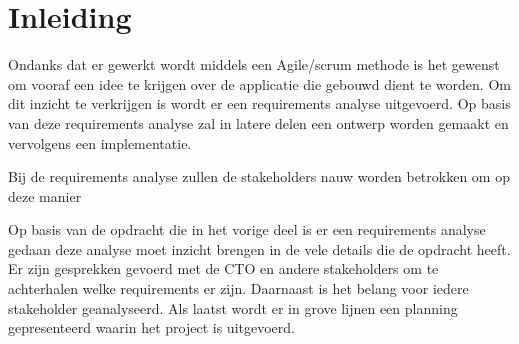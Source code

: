 
\chapter{Inleiding}\label{ch:02_inleiding}\label{inReqPlan}
Ondanks dat er gewerkt wordt middels een Agile/scrum methode is het gewenst om vooraf een idee te krijgen over de applicatie die gebouwd dient te worden. Om dit inzicht te verkrijgen is wordt er een requirements analyse uitgevoerd. Op basis van deze requirements analyse zal in latere delen een ontwerp worden gemaakt en vervolgens een implementatie.

Bij de requirements analyse zullen de stakeholders nauw worden betrokken om op deze manier



Op basis van de opdracht die in het vorige deel is er een requirements analyse gedaan deze analyse moet inzicht brengen in de vele details die de opdracht heeft.
Er zijn gesprekken gevoerd met de CTO en andere stakeholders om te achterhalen welke requirements er zijn.
Daarnaast is het belang voor iedere stakeholder geanalyseerd.
Als laatst wordt er in grove lijnen een planning gepresenteerd waarin het project is uitgevoerd.
